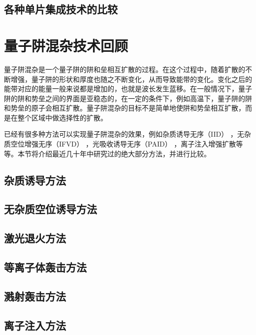 \documentclass{ZJUthesis}
\begin{document}
\subsection{各种单片集成技术的比较}

\section{量子阱混杂技术回顾}

量子阱混杂是一个量子阱的阱和垒相互扩散的过程。在这个过程中，随着扩散的不断增强，量子阱的形状和厚度也随之不断变化，从而导致能带的变化。变化之后的能带对应的能量一般来说都是增加的，也就是波长发生蓝移。在一般情况下，量子阱的阱和势垒之间的界面是亚稳态的，在一定的条件下，例如高温下，量子阱的阱和势垒的原子会相互扩散。量子阱混杂的目标不是简单地使阱和势垒相互扩散，而是在整个区域中做选择性的扩散。

已经有很多种方法可以实现量子阱混杂的效果，例如杂质诱导无序（IID） \cite{holonyak1998impurity-IID} ，无杂质空位增强无序（IFVD） \cite{si1998area-IFVD}，光吸收诱导无序（PAID） \cite{mckee1997monolithic-PAID}，离子注入增强扩散\cite{charbonneau1998photonic-implantation}等等。本节将介绍最近几十年中研究过的绝大部分方法，并进行比较。

\subsection{杂质诱导方法}

\subsection{无杂质空位诱导方法}

\subsection{激光退火方法}

\subsection{等离子体轰击方法}

\subsection{溅射轰击方法}

\subsection{离子注入方法}
\end{document}
